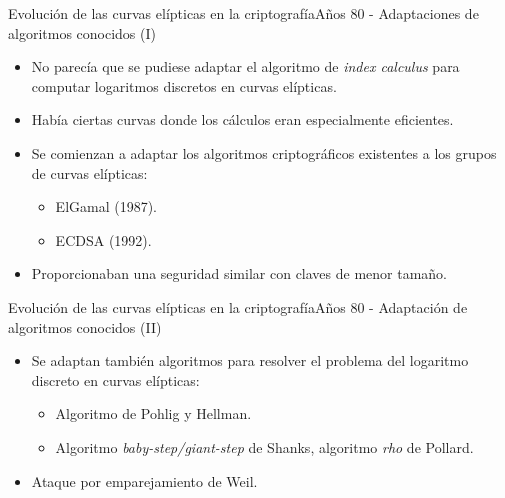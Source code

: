 \documentclass[spanish]{beamer}
\begin{document}
\begin{frame}[fragile]{Evolución de las curvas elípticas en la criptografía}{Años 80 - Adaptaciones de algoritmos conocidos (I)}
  \begin{itemize}
    \item No parecía que se pudiese adaptar el algoritmo de \textit{index calculus} para computar logaritmos discretos en curvas elípticas.
    \item Había ciertas curvas donde los cálculos eran especialmente eficientes.
    \item Se comienzan a adaptar los algoritmos criptográficos existentes a los grupos de curvas elípticas:
    \begin{itemize}
	    \item ElGamal (1987). %
	    \item ECDSA (1992).   %
    \end{itemize}
    \item Proporcionaban una seguridad similar con claves de menor tamaño.
  \end{itemize}
\end{frame}

\begin{frame}[fragile]{Evolución de las curvas elípticas en la criptografía}{Años 80 - Adaptación de algoritmos conocidos (II)}
  \begin{itemize}
    \item Se adaptan también algoritmos para resolver el problema del logaritmo discreto en curvas elípticas: %
      \begin{itemize}
	    \item Algoritmo de Pohlig y Hellman.
        \item Algoritmo \textit{baby-step/giant-step} de Shanks, algoritmo \textit{rho} de Pollard. %
    \end{itemize}

    \item Ataque por emparejamiento de Weil. %
  \end{itemize}

\end{frame}
\end{document}
